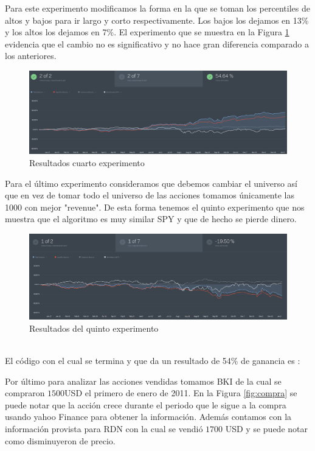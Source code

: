 \documentclass[16pt,a4paper,notitlepage,onecolumn,oneside]{article}
\begin{document}
Para este experimento modificamos la forma en la que se toman los percentiles de altos y bajos para ir largo y corto respectivamente. Los bajos los dejamos en 13\% y los altos los dejamos en 7\%. El  experimento que se muestra en la Figura \ref{fig:experimento4} evidencia que el cambio no es significativo y no hace gran diferencia comparado a los anteriores. \\
\begin{figure}
	\centering
	\includegraphics[width=1.1\linewidth]{experimento_4}
	\caption{Resultados cuarto experimento }
	\label{fig:experimento4}
\end{figure}
Para el último experimento consideramos que debemos cambiar el universo así que en vez de tomar todo el universo de las acciones tomamos únicamente las 1000 con mejor "revenue". De esta forma tenemos el quinto experimento que nos muestra que el algoritmo es muy similar SPY y que de hecho se pierde dinero.
\begin{figure}
	\centering
	\includegraphics[width=1.1\linewidth]{experimento_5}
	\caption{Resultados del quinto experimento}
	\label{fig:experimento5}
\end{figure}
\\

El código con el cual se termina y que da un resultado de 54\% de ganancia es :



Por último para analizar las acciones vendidas tomamos BKI de la cual se compraron $1500$USD el primero de enero de 2011. En la Figura \ref{fig:compra}  se puede notar que la acción crece durante el periodo que le sigue a la compra usando yahoo Finance para obtener la información. Además contamos con la información provista para RDN con la cual se vendió $ 1700$ USD y se puede notar como disminuyeron de precio.\\
\end{document}
